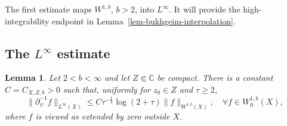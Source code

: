 \documentclass[a4paper,11pt]{article}
\newcommand{\pr}{\partial}
\newcommand{\C}{\mathbb{C}}
\theoremstyle{plain}
\newtheorem{lem}[thm]{Lemma}
\theoremstyle{definition}
\theoremstyle{remark}
\begin{document}
The first estimate maps $W^{1,b}$, $b>2$, into $L^\infty$.  It will provide the high-integrability endpoint in Lemma~\ref{lem-bukhgeim-interpolation}.

\subsection{The \texorpdfstring{$L^\infty$}{L-infinity} estimate}

\begin{lem}\label{lem-inf}
Let $2<b<\infty$ and let $Z\Subset\C$ be compact.  There is a constant $C=C_{X,Z,b}>0$ such that, uniformly for $z_0\in Z$ and $\tau\geq2$,
\begin{equation}
\|\pr_\psi^{-1}f\|_{L^\infty(X)}\leq  C\tau^{-\frac{1}{2}}\log(2+\tau) \|f\|_{W^{1,b}(X)},\quad \forall f\in W^{1,b}_0(X),
\end{equation}
where $f$ is viewed as extended by zero outside $X$.
\end{lem}
\end{document}
